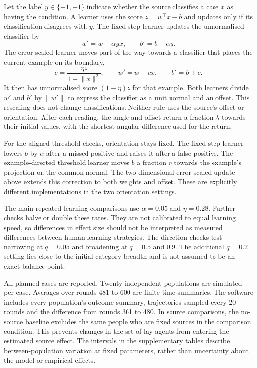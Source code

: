 Let the label $y\in\{-1,+1\}$ indicate whether the source classifies a case $x$ as having the condition. A learner uses the score $z=w^\top x-b$ and updates only if its classification disagrees with $y$. The fixed-step learner updates the unnormalised classifier by
\[
w' = w+\alpha yx,\qquad b'=b-\alpha y.
\]
The error-scaled learner moves part of the way towards a classifier that places the current example on its boundary,
\[
c=\frac{\eta z}{1+\lVert x\rVert^2},\qquad w'=w-cx,\qquad b'=b+c.
\]
It then has unnormalised score $(1-\eta)z$ for that example. Both learners divide $w'$ and $b'$ by $\lVert w'\rVert$ to express the classifier as a unit normal and an offset. This rescaling does not change classifications. Neither rule uses the source's offset or orientation. After each reading, the angle and offset return a fraction $\lambda$ towards their initial values, with the shortest angular difference used for the return.

For the aligned threshold checks, orientation stays fixed. The fixed-step learner lowers $b$ by $\alpha$ after a missed positive and raises it after a false positive. The example-directed threshold learner moves $b$ a fraction $\eta$ towards the example's projection on the common normal. The two-dimensional error-scaled update above extends this correction to both weights and offset. These are explicitly different implementations in the two orientation settings.

The main repeated-learning comparisons use $\alpha=0.05$ and $\eta=0.28$. Further checks halve or double these rates. They are not calibrated to equal learning speed, so differences in effect size should not be interpreted as measured differences between human learning strategies. The direction checks test narrowing at $q=0.05$ and broadening at $q=0.5$ and $0.9$. The additional $q=0.2$ setting lies close to the initial category breadth and is not assumed to be an exact balance point.

All planned cases are reported. Twenty independent populations are simulated per case. Averages over rounds 481 to 600 are finite-time summaries. The software includes every population's outcome summary, trajectories sampled every 20 rounds and the difference from rounds 361 to 480. In source comparisons, the no-source baseline excludes the same people who are fixed sources in the comparison condition. This prevents changes in the set of lay agents from entering the estimated source effect. The intervals in the supplementary tables describe between-population variation at fixed parameters, rather than uncertainty about the model or empirical effects.


